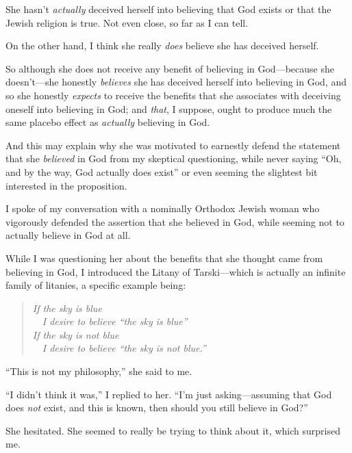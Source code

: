{
 She hasn't \textit{actually} deceived herself into
believing that God exists or that the Jewish religion is true. Not even
close, so far as I can tell.}

{
 On the other hand, I think she really \textit{does} believe she
has deceived herself.}

{
 So although she does not receive any benefit of believing in
God---because she doesn't---she honestly
\textit{believes} she has deceived herself into believing in God, and
so she honestly \textit{expects} to receive the benefits that she
associates with deceiving oneself into believing in God; and
\textit{that}, I suppose, ought to produce much the same placebo effect
as \textit{actually} believing in God.}

{
 And this may explain why she was motivated to earnestly defend the
statement that she \textit{believed} in God from my skeptical
questioning, while never saying ``Oh, and by the way,
God actually does exist'' or even seeming the
slightest bit interested in the proposition.}

\myendsectiontext


{
 I spoke of my conversation with a nominally Orthodox Jewish woman
who vigorously defended the assertion that she believed in God, while
seeming not to actually believe in God at all. }

{
 While I was questioning her about the benefits that she thought
came from believing in God, I introduced the Litany of Tarski---which
is actually an infinite family of litanies, a specific example being:}

\begin{verse}
 \textit{If the sky is blue} \\
\ \  \textit{I desire to believe ``the sky is blue''} \\
 \textit{If the sky is not blue} \\
\ \  \textit{I desire to believe ``the sky is not blue.''} \\
\end{verse}

{
 ``This is not my philosophy,''
she said to me.}

{
 ``I didn't think it
was,'' I replied to her.
``I'm just asking---assuming that God
does \textit{not} exist, and this is known, then should you still
believe in God?''}

{
 She hesitated. She seemed to really be trying to think about it,
which surprised me.}

